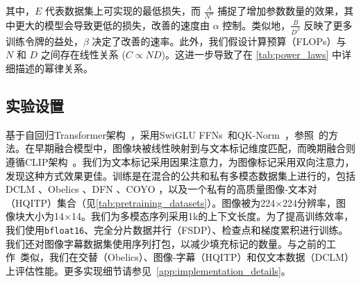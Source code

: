 \noindent 其中，\(E\) 代表数据集上可实现的最低损失，而 \(\frac{A}{N^{\alpha}}\) 捕捉了增加参数数量的效果，其中更大的模型会导致更低的损失，改善的速度由 \(\alpha\) 控制。类似地，\(\frac{B}{D^{\beta}}\) 反映了更多训练令牌的益处，\(\beta\) 决定了改善的速率。此外，我们假设计算预算（FLOPs）与 \(N\) 和 \(D\) 之间存在线性关系 (\(C \propto ND\))。这进一步导致了在 \cref{tab:power_laws} 中详细描述的幂律关系。



\begin{table}[h]
    \centering
    \setlength{\tabcolsep}{16pt}
    \renewcommand{\arraystretch}{1}
     \caption{\textbf{预训练数据混合。} 除非另有说明，训练混合数据包含45\%、45\%和10\%的图像说明、交错文档和仅文本数据。}
    \label{tab:pretraining_datasets}
    \vspace{-5pt}
\end{table}
\subsection{实验设置}
基于自回归Transformer架构~\citep{vaswani2017attention}，采用SwiGLU FFNs~\citep{shazeer2020glu}和QK-Norm~\citep{dehghani2023scaling}，参照~\citet{li2024datacomp}的方法。在早期融合模型中，图像块被线性映射到与文本标记维度匹配，而晚期融合则遵循CLIP架构~\citep{radford2021learning}。我们为文本标记采用因果注意力，为图像标记采用双向注意力，发现这种方式效果更佳。训练是在混合的公共和私有多模态数据集上进行的，包括DCLM \citep{li2024datacomp}、Obelics \citep{laurenccon2024obelics}、DFN \citep{fang2023data}、COYO \citep{kakaobrain2022coyo700m}，以及一个私有的高质量图像-文本对（HQITP）集合（见\cref{tab:pretraining_datasets}）。图像被为224×224分辨率，图像块大小为14×14。我们为多模态序列采用1k的上下文长度。为了提高训练效率，我们使用\texttt{bfloat16}、完全分片数据并行（FSDP）\citep{zhao2023pytorch}、检查点和梯度累积进行训练。我们还对图像字幕数据集使用序列打包，以减少填充标记的数量。与之前的工作~\citep{hoffmann2022training,aghajanyan2023scalingmm,abnar2025parameters}类似，我们在交替（Obelics）、图像-字幕（HQITP）和仅文本数据（DCLM）上评估性能。更多实现细节请参见~\cref{app:implementation_details}。

